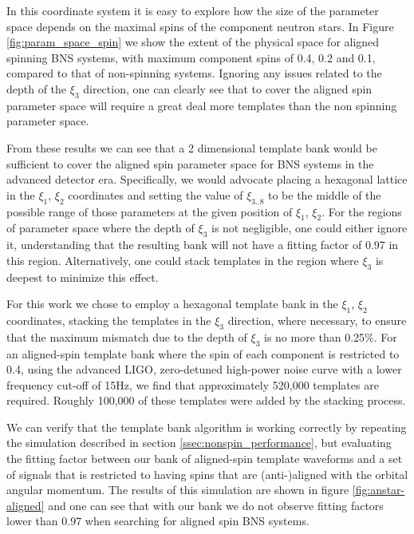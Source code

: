 In this coordinate system it is easy to explore how the size of the parameter space
depends on the maximal spins of the component neutron stars. In Figure \ref{fig:param_space_spin} we show the
extent of the physical space for aligned spinning BNS systems, with maximum component
spins of 0.4, 0.2 and 0.1, compared to that
of non-spinning systems. Ignoring any issues related to the depth of the $\xi_3$
direction, one can clearly see that to cover the aligned spin parameter space will require
a great deal more templates than the non spinning parameter space.


From these results we can see that a 2 dimensional template bank would be sufficient to cover the aligned
spin parameter space for BNS systems in the advanced detector era. Specifically, we would advocate
placing a hexagonal lattice in the $\xi_1$, $\xi_2$ coordinates and setting the value of $\xi_{3..8}$
to be the middle of the possible range of those parameters at the given position of $\xi_1$, $\xi_2$.
For the regions of parameter space where the depth of $\xi_3$ is not negligible, one could either ignore
it, understanding that the resulting bank will not have a fitting factor of 0.97 in this region.
Alternatively, one could stack templates in the region where $\xi_3$ is deepest to minimize this effect.


For this work we chose to employ a hexagonal template bank in the $\xi_1$, $\xi_2$ coordinates, stacking the
templates in the $\xi_3$ direction, where necessary, to ensure that the maximum mismatch due to the depth
of $\xi_3$ is no more
than 0.25\%. For an aligned-spin template bank where the spin of each component is restricted to 0.4,
using the advanced LIGO, zero-detuned high-power noise curve with a lower frequency cut-off of 15Hz,
we find that approximately 520,000 templates are required.
Roughly 100,000 of these templates were added by the stacking process.

We can verify that the template bank algorithm is working correctly by repeating the simulation described
in section \ref{ssec:nonspin_performance}, but evaluating the fitting factor between our bank of aligned-spin
template waveforms and a set of signals that is restricted to having spins that are (anti-)aligned with the
orbital angular momentum. The results of this simulation are shown in figure \ref{fig:anstar-aligned} and
one can see that with our bank we do not observe fitting factors lower than 0.97 when searching for aligned
spin BNS systems.


